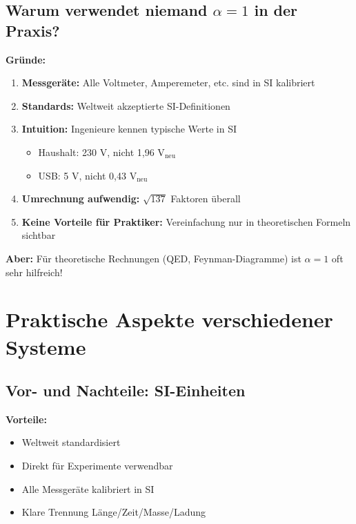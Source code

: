 	\subsection{Warum verwendet niemand $\alpha = 1$ in der Praxis?}
	
	\textbf{Gründe:}
	\begin{enumerate}
		\item \textbf{Messgeräte:} Alle Voltmeter, Amperemeter, etc. sind in SI kalibriert
		
		\item \textbf{Standards:} Weltweit akzeptierte SI-Definitionen
		
		\item \textbf{Intuition:} Ingenieure kennen typische Werte in SI
		\begin{itemize}
			\item Haushalt: 230 V, nicht 1{,}96 V$_{\text{neu}}$
			\item USB: 5 V, nicht 0{,}43 V$_{\text{neu}}$
		\end{itemize}
		
		\item \textbf{Umrechnung aufwendig:} $\sqrt{137}$ Faktoren überall
		
		\item \textbf{Keine Vorteile für Praktiker:} Vereinfachung nur in theoretischen Formeln sichtbar
	\end{enumerate}
	
	\textbf{Aber:} Für theoretische Rechnungen (QED, Feynman-Diagramme) ist $\alpha = 1$ oft sehr hilfreich!
	
	\section{Praktische Aspekte verschiedener Systeme}
	
	\subsection{Vor- und Nachteile: SI-Einheiten}
	
	\textbf{Vorteile:}
	\begin{itemize}
		\item Weltweit standardisiert
		\item Direkt für Experimente verwendbar
		\item Alle Messgeräte kalibriert in SI
		\item Klare Trennung Länge/Zeit/Masse/Ladung
	\end{itemize}
	
